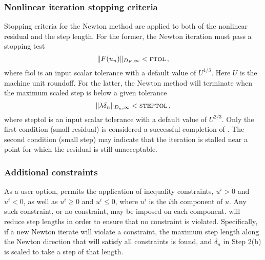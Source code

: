 \subsubsection*{Nonlinear iteration stopping criteria}
Stopping criteria for the Newton method are applied to
both of the nonlinear residual and the step length.  For the
former, the Newton iteration must pass a stopping test
\[ \|F(u_n)\|_{D_F,\infty} < \mbox{\sc ftol} \, , \]
where {\sc ftol} is an input scalar tolerance with a default value
of $U^{1/3}$.  Here $U$ is the machine unit roundoff.
For the latter, the Newton method will terminate
when the maximum scaled step is below a given tolerance
\[ \|\lambda\delta_n\|_{D_u,\infty} < \mbox{\sc steptol} \, , \]
where {\sc steptol} is an input scalar tolerance with a default
value of $U^{2/3}$.  Only the first condition (small residual)
is considered a successful completion of {\kinsol}.  The second
condition (small step) may indicate that the iteration is stalled
near a point for which the residual is still unacceptable.


\subsubsection*{Additional constraints}
As a user option, {\kinsol} permits the application of inequality
constraints, $u^i > 0$ and $u^i < 0$, as well as $u^i \geq 0$ and
$u^i \leq 0$, where $u^i$ is the $i$th component of $u$.  Any such
constraint, or no constraint, may be imposed on each component.
{\kinsol} will reduce step lengths in order to ensure that no
constraint is violated.  Specifically, if a new Newton iterate
will violate a constraint, the maximum step length along
the Newton direction that will satisfy all constraints is found,
and $\delta_n$ in Step 2(b) is scaled to take a step of that length.


